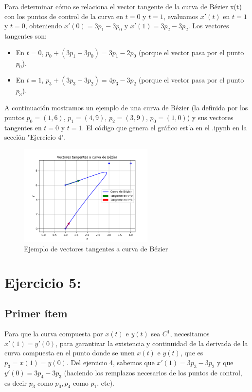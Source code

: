 \documentclass{article}
\begin{document}
Para determinar cómo se relaciona el vector tangente de la curva de Bézier x(t) con los puntos de control de la curva en $t=0$ y $t=1$, evaluamos $x'(t)$ en $t = 1$ y $t = 0$, obteniendo $x'(0) = 3p_1-3p_0$ y $x'(1) = 3p_2-3p_2$. Los vectores tangentes son:
\begin{itemize}
    \item En $t = 0$, $p_0 + (3p_1-3p_0) = 3p_1-2p_0$ (porque el vector pasa por el punto $p_0$).
    \item En $t = 1$, $p_3 +  (3p_3-3p_2) =  4p_3-3p_2$ (porque el vector pasa por el punto $p_3$).
\end{itemize}

A continuación mostramos un ejemplo de una curva de Bézier (la definida por los puntos $p_0 = (1, 6)$, $p_1 = (4, 9)$, $p_2 = (3, 9)$, $p_0 = (1, 0)$) y sus vectores tangentes en $t = 0$ y $t = 1$. El código que genera el gráfico est[a en el .ipynb en la sección "Ejercicio 4".

\begin{figure}[H]
    \centering
    \includegraphics[width=0.6\textwidth]{imagenes/ej4.png}
    \caption{Ejemplo de vectores tangentes a curva de Bézier}
    \label{fig:ejemplo}
\end{figure}

\section*{Ejercicio 5:}
\subsection*{Primer ítem}
Para que la curva compuesta por $x(t)$ e $y(t)$ sea $C^1$, necesitamos $x'(1) = y'(0)$, para garantizar la existencia y continuidad de la derivada de la curva compuesta en el punto donde se unen $x(t)$ e $y(t)$, que es $p_3 = x(1) = y(0)$. Del ejercicio 4, sabemos que $x'(1) = 3p_3-3p_2$ y que $y'(0) = 3p_4-3p_3$ (haciendo los remplazos necesarios de los puntos de control, es decir $p_3$ como $p_0, p_4$ como $p_1$, etc).
\end{document}
